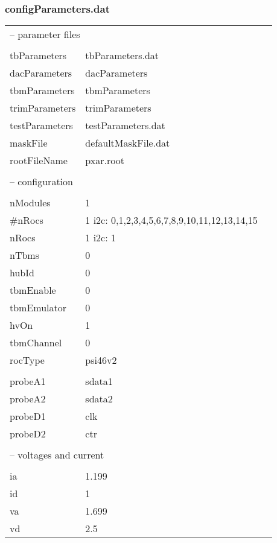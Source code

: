 \subsubsection{configParameters.dat}
\ubuntu
\begin{tabular}{llr}
\hline
\multicolumn{2}{l}{-- parameter files}		\\
	&				\\
tbParameters	&	tbParameters.dat			\\
dacParameters	&	dacParameters			\\
tbmParameters	&	tbmParameters			\\
trimParameters	&	trimParameters			\\
testParameters	&	testParameters.dat			\\
maskFile	&	defaultMaskFile.dat			\\
rootFileName	&	pxar.root			\\
	&				\\
\multicolumn{2}{l}{-- configuration}	\\
	&				\\
nModules	&	1			\\
\#nRocs	&	1	i2c:	0,1,2,3,4,5,6,7,8,9,10,11,12,13,14,15	\\
nRocs	&	1	i2c:	1	\\
nTbms	&	0			\\
hubId	&	0			\\
tbmEnable	&	0			\\
tbmEmulator	&	0			\\
hvOn	&	1			\\
tbmChannel	&	0			\\
rocType	&	psi46v2			\\
	&				\\
probeA1	&	sdata1			\\
probeA2	&	sdata2			\\
probeD1	&	clk			\\
probeD2	&	ctr			\\
	&				\\
\multicolumn{2}{l}{-- voltages and current}	\\
	&				\\
ia	&	1.199			\\
id	&	1			\\
va	&	1.699			\\
vd	&	2.5			\\
\hline
\end{tabular}
